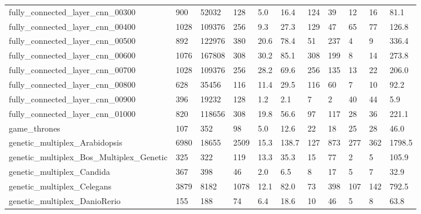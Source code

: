 \begin{longtable}{lllllllllll}
 fully\_connected\_layer\_cnn\_00300                    & 900        & 52032     & 128   & 5.0    & 16.4   & 124   & 39     & 12     & 16     & 81.1    \\
 fully\_connected\_layer\_cnn\_00400                    & 1028       & 109376    & 256   & 9.3    & 27.3   & 129   & 47     & 65     & 77     & 126.8   \\
 fully\_connected\_layer\_cnn\_00500                    & 892        & 122976    & 380   & 20.6   & 78.4   & 51    & 237    & 4      & 9      & 336.4   \\
 fully\_connected\_layer\_cnn\_00600                    & 1076       & 167808    & 308   & 30.2   & 85.1   & 308   & 199    & 8      & 14     & 273.8   \\
 fully\_connected\_layer\_cnn\_00700                    & 1028       & 109376    & 256   & 28.2   & 69.6   & 256   & 135    & 13     & 22     & 206.0   \\
 fully\_connected\_layer\_cnn\_00800                    & 628        & 35456     & 116   & 11.4   & 29.5   & 116   & 60     & 7      & 10     & 92.2    \\
 fully\_connected\_layer\_cnn\_00900                    & 396        & 19232     & 128   & 1.2    & 2.1    & 7     & 2      & 40     & 44     & 5.9     \\
 fully\_connected\_layer\_cnn\_01000                    & 820        & 118656    & 308   & 19.8   & 56.6   & 97    & 117    & 28     & 36     & 221.1   \\
 game\_thrones                                       & 107        & 352       & 98    & 5.0    & 12.6   & 22    & 18     & 25     & 28     & 46.0    \\
 genetic\_multiplex\_Arabidopsis                      & 6980       & 18655     & 2509  & 15.3   & 138.7  & 127   & 873    & 277    & 362    & 1798.5  \\
 genetic\_multiplex\_Bos\_Multiplex\_Genetic            & 325        & 322       & 119   & 13.3   & 35.3   & 15    & 77     & 2      & 5      & 105.9   \\
 genetic\_multiplex\_Candida                          & 367        & 398       & 46    & 2.0    & 6.5    & 8     & 17     & 5      & 7      & 32.9    \\
 genetic\_multiplex\_Celegans                         & 3879       & 8182      & 1078  & 12.1   & 82.0   & 73    & 398    & 107    & 142    & 792.5   \\
 genetic\_multiplex\_DanioRerio                       & 155        & 188       & 74    & 6.4    & 18.6   & 10    & 46     & 5      & 8      & 63.8    \\

\end{longtable}
